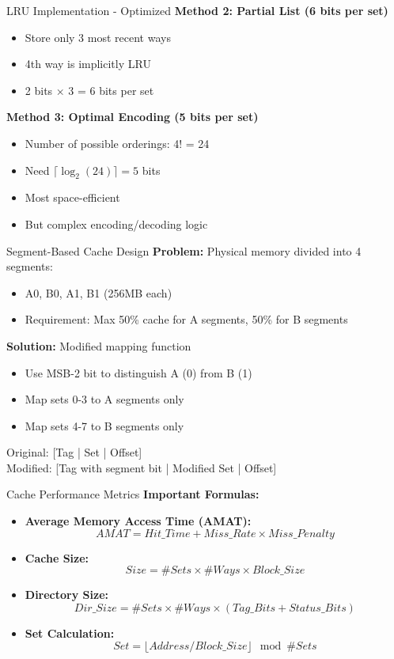 \documentclass[aspectratio=169,12pt]{beamer}
\begin{document}
\begin{frame}{LRU Implementation - Optimized}
\textbf{Method 2: Partial List (6 bits per set)}
\begin{itemize}
    \item Store only 3 most recent ways
    \item 4th way is implicitly LRU
    \item 2 bits × 3 = 6 bits per set
\end{itemize}

\textbf{Method 3: Optimal Encoding (5 bits per set)}
\begin{itemize}
    \item Number of possible orderings: 4! = 24
    \item Need $\lceil \log_2(24) \rceil = 5$ bits
    \item Most space-efficient
    \item But complex encoding/decoding logic
\end{itemize}
\end{frame}

\begin{frame}{Segment-Based Cache Design}
\textbf{Problem:} Physical memory divided into 4 segments:
\begin{itemize}
    \item A0, B0, A1, B1 (256MB each)
    \item Requirement: Max 50\% cache for A segments, 50\% for B segments
\end{itemize}

\textbf{Solution:} Modified mapping function
\begin{itemize}
    \item Use MSB-2 bit to distinguish A (0) from B (1)
    \item Map sets 0-3 to A segments only
    \item Map sets 4-7 to B segments only
\end{itemize}

Original: [Tag | Set | Offset]\\
Modified: [Tag with segment bit | Modified Set | Offset]
\end{frame}

\begin{frame}{Cache Performance Metrics}
\textbf{Important Formulas:}

\begin{itemize}
    \item \textbf{Average Memory Access Time (AMAT):}
    $$AMAT = Hit\_Time + Miss\_Rate \times Miss\_Penalty$$
    
    \item \textbf{Cache Size:}
    $$Size = \#Sets \times \#Ways \times Block\_Size$$
    
    \item \textbf{Directory Size:}
    $$Dir\_Size = \#Sets \times \#Ways \times (Tag\_Bits + Status\_Bits)$$
    
    \item \textbf{Set Calculation:}
    $$Set = \lfloor Address / Block\_Size \rfloor \mod \#Sets$$
\end{itemize}
\end{frame}
\end{document}
